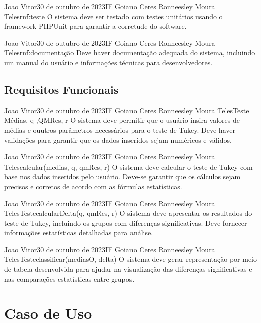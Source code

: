 {Joao Vitor}{30 de outubro de 2023}{IF Goiano Ceres}
{Ronneesley Moura Teles}{rnf:teste}
{O sistema deve ser testado com testes unitários usando o framework PHPUnit para garantir a corretude do software.}

{Joao Vitor}{30 de outubro de 2023}{IF Goiano Ceres}
{Ronneesley Moura Teles}{rnf:documentação}
{Deve haver documentação adequada do sistema, incluindo um manual do usuário e informações técnicas para desenvolvedores.}


\subsection{Requisitos Funcionais}

{Joao Vitor}{30 de outubro de 2023}{IF Goiano Ceres}
{Ronneesley Moura Teles}{Teste}{ Médias, q ,QMRes, r}
{O sistema deve permitir que o usuário insira valores de médias e ouutros parâmetros necessários para o teste de Tukey. Deve haver validações para garantir que os dados inseridos sejam numéricos e válidos.}

{Joao Vitor}{30 de outubro de 2023}{IF Goiano Ceres}
{Ronneesley Moura Teles}{}{calcular(medias, q, qmRes, r)}
{O sistema deve calcular o teste de Tukey com base nos dados inseridos pelo usuário.
Deve-se garantir que os cálculos sejam precisos e corretos de acordo com as fórmulas estatísticas.}

{Joao Vitor}{30 de outubro de 2023}{IF Goiano Ceres}
{Ronneesley Moura Teles}{Teste}{calcularDelta(q, qmRes, r)}
{O sistema deve apresentar os resultados do teste de Tukey, incluindo os grupos com diferenças significativas.
Deve fornecer informações estatísticas detalhadas para análise.}

{Joao Vitor}{30 de outubro de 2023}{IF Goiano Ceres}
{Ronneesley Moura Teles}{Teste}{classificar(mediasO, delta)}
{O sistema deve gerar representação por meio de tabela desenvolvida para ajudar na visualização das diferenças significativas e nas comparações estatísticas entre grupos.}

\section{Caso de Uso}

